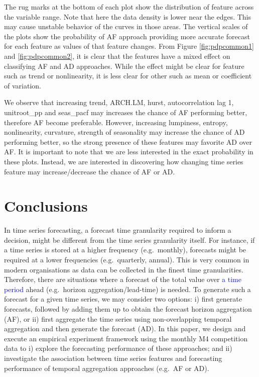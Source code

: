 \documentclass[preprint, 3p,
authoryear]{elsarticle} %
\begin{document}
The rug marks at the bottom of each plot show the distribution of
feature across the variable range. Note that here the data density is
lower near the edges. This may cause unstable behavior of the curves in
those areas. The vertical scales of the plots show the probability of AF
approach providing more accurate forecast for each feature as values of
that feature changes. From Figure \ref{fig:pdpcommon1} and
\ref{fig:pdpcommon2}, it is clear that the features have a mixed effect
on classifying AF and AD approaches. While the effect might be clear for
feature such as trend or nonlinearity, it is less clear for other such
as mean or coefficient of variation.

We observe that increasing trend, ARCH.LM, hurst, autocorrelation lag 1,
unitroot\_pp and seas\_pacf may increases the chance of AF performing
better, therefore AF become preferable. However, increasing lumpiness,
entropy, nonlinearity, curvature, strength of seasonality may increase
the chance of AD performing better, so the strong presence of these
features may favorite AD over AF. It is important to note that we are
less interested in the exact probability in these plots. Instead, we are
interested in discovering how changing time series feature may
increase/decrease the chance of AF or AD.

\hypertarget{con}{%
\section{Conclusions}\label{con}}

In time series forecasting, a forecast time granularity required to
inform a decision, might be different from the time series granularity
itself. For instance, if a time series is stored at a higher frequency
(e.g.~monthly), forecasts might be required at a lower frequencies
(e.g.~quarterly, annual). This is very common in modern organisations as
data can be collected in the finest time granularities. Therefore, there
are situations where a forecast of the total value over
\textcolor{blue}{a time period} ahead (e.g.~horizon
aggregation/lead-time) is needed. To generate such a forecast for a
given time series, we may consider two options: i) first generate
forecasts, followed by adding them up to obtain the forecast horizon
aggregation (AF), or ii) first aggregate the time series using
non-overlapping temporal aggregation and then generate the forecast
(AD). In this paper, we design and execute an empirical experiment
framework using the monthly M4 competition data to i) explore the
forecasting performance of these approaches; and ii) investigate the
association between time series features and forecasting performance of
temporal aggregation approaches (e.g.~AF or AD).
\end{document}
